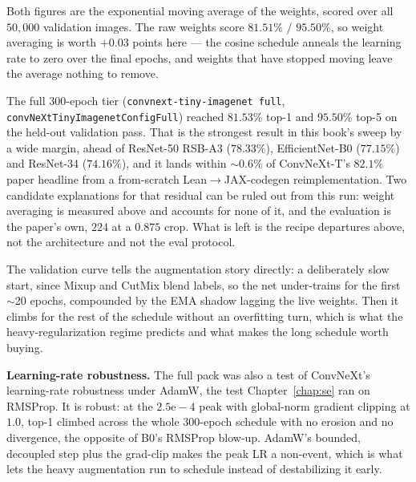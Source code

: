 \noindent Both figures are the exponential moving average of the
weights, scored over all $50{,}000$ validation images. The raw weights
score $81.51\%$ / $95.50\%$, so weight averaging is worth $+0.03$ points
here --- the cosine schedule anneals the learning rate to zero over the
final epochs, and weights that have stopped moving leave the average
nothing to remove.

The full 300-epoch tier (\texttt{convnext-tiny-imagenet full},
\texttt{convNeXtTinyImagenetConfigFull}) reached $\mathbf{81.53\%}$ top-1
and $\mathbf{95.50\%}$ top-5 on the held-out validation pass. That is the
strongest result in this book's sweep by a wide margin, ahead of
ResNet-50 RSB-A3 ($78.33\%$), EfficientNet-B0 ($77.15\%$) and ResNet-34
($74.16\%$), and it lands within
$\sim$0.6\% of ConvNeXt-T's $82.1\%$ paper headline from a from-scratch
Lean$\to$JAX-codegen reimplementation. Two candidate explanations for
that residual can be ruled out from this run: weight averaging is
measured above and accounts for none of it, and the evaluation is the
paper's own, $224$ at a $0.875$ crop. What is left is the recipe
departures above, not the architecture and not the eval protocol.

The validation curve tells the augmentation story directly: a
deliberately slow start, since Mixup and CutMix blend labels, so the net
under-trains for the first $\sim$20 epochs, compounded by the EMA shadow
lagging the live weights. Then it climbs for the rest of the schedule
without an overfitting turn, which is what the heavy-regularization
regime predicts and what makes the long schedule worth buying.

\textbf{Learning-rate robustness.} The full pack was also a test of ConvNeXt's learning-rate robustness under
AdamW, the test Chapter~\ref{chap:se} ran on RMSProp. It is robust: at
the $2.5\mathrm{e}{-}4$ peak with global-norm gradient clipping at $1.0$,
top-1 climbed across the whole 300-epoch schedule with no erosion and no
divergence, the opposite of B0's RMSProp blow-up. AdamW's bounded,
decoupled step plus the grad-clip makes the peak LR a non-event, which is
what lets the heavy augmentation run to schedule instead of destabilizing
it early.

